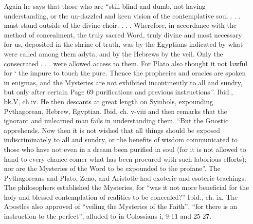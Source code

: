 \begin{quotationx}
Again he says that those who are ``still blind and dumb, not having understanding, or the un-dazzled and keen vision of the contemplative soul . . . must stand outside of the divine choir. . . . Wherefore, in accordance with the method of concealment, the truly sacred Word, truly divine and most necessary for us, deposited in the shrine of truth, was by the Egyptians indicated by what were called among them adyta, and by the Hebrews by the veil. Only the consecrated . . . were allowed access to them. For Plato also thought it not lawful for ` the impure to touch the pure. Thence the prophecies and oracles are spoken in enigmas, and the Mysteries are not exhibited incontinently to all and sundry, but only after certain Page 69 purifications and previous instructions''. Ibid., bk.V, ch.iv. He then descants at great length on Symbols, expounding Pythagorean, Hebrew, Egyptian, Ibid, ch. v-viii and then remarks that the ignorant and unlearned man fails in understanding them. ``But the Gnostic apprehends. Now then it is not wished that all things should be exposed indiscriminately to all and sundry, or the benefits of wisdom communicated to those who have not even in a dream been purified in soul (for it is not allowed to hand to every chance comer what has been procured with such laborious efforts); nor are the Mysteries of the Word to be expounded to the profane''. The Pythagoreans and Plato, Zeno, and Aristotle had exoteric and esoteric teachings. The philosophers established the Mysteries, for ``was it not more beneficial for the holy and blessed contemplation of realities to be concealed?'' Ibid., ch. ix. The Apostles also approved of ``veiling the Mysteries of the Faith'', ``for there is an instruction to the perfect'', alluded to in Colossians i, 9-11 and 25-27.


\end{quotationx}
